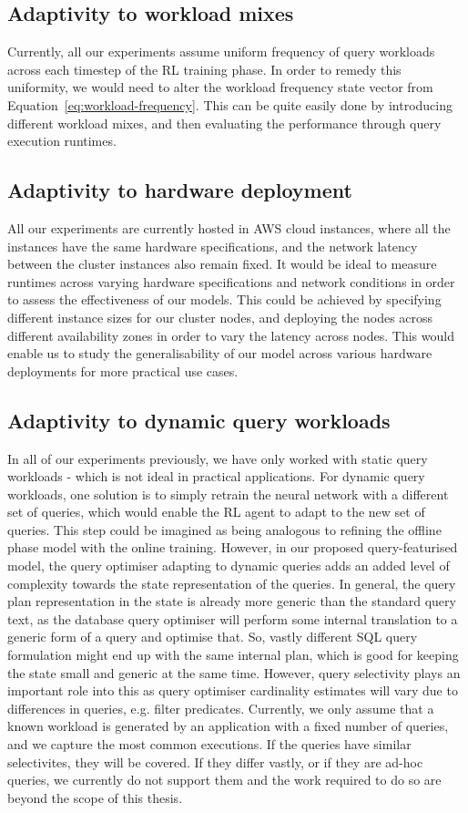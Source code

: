 \subsection{Adaptivity to workload mixes}
Currently, all our experiments assume uniform frequency of query workloads across each timestep of the RL training phase. In order to remedy this uniformity, we would need to alter the workload frequency state vector from Equation~\ref{eq:workload-frequency}. This can be quite easily done by introducing different workload mixes, and then evaluating the performance through query execution runtimes. 

\subsection{Adaptivity to hardware deployment}
All our experiments are currently hosted in AWS cloud instances, where all the instances have the same hardware specifications, and the network latency between the cluster instances also remain fixed. It would be ideal to measure runtimes across varying hardware specifications and network conditions in order to assess the effectiveness of our models. This could be achieved by specifying different instance sizes for our cluster nodes, and deploying the nodes across different availability zones in order to vary the latency across nodes. This would enable us to study the generalisability of our model across various hardware deployments for more practical use cases.  

\subsection{Adaptivity to dynamic query workloads}
In all of our experiments previously, we have only worked with static query workloads - which is not ideal in practical applications. For dynamic query workloads, one solution is to simply retrain the neural network with a different set of queries, which would enable the RL agent to adapt to the new set of queries. This step could be imagined as being analogous to refining the offline phase model with the online training. 
However, in our proposed query-featurised model, the query optimiser adapting to dynamic queries adds an added level of complexity towards the state representation of the queries. In general, the query plan representation in the state is already more generic than the standard query text, as the database query optimiser will perform some internal translation to a generic form of a query and optimise that. So, vastly different SQL query formulation might end up with the same internal plan, which is good for keeping the state small and generic at the same time.
However, query selectivity plays an important role into this as query optimiser cardinality estimates will vary due to differences in queries, e.g. filter predicates. Currently, we only assume that a known workload is generated by an application with a fixed number of queries, and we capture the most common executions. If the queries have similar selectivites, they will be covered. If they differ vastly, or if they are ad-hoc queries, we currently do not support them and the work required to do so are beyond the scope of this thesis. 

